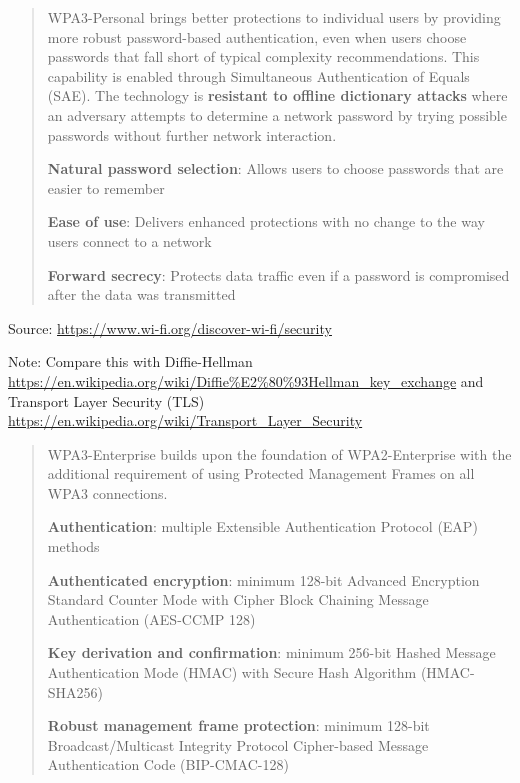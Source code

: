 \documentclass[Screen16to9,17pt]{foils}
\begin{document}

\begin{quote}
WPA3-Personal brings better protections to individual users by providing more robust password-based authentication, even when users choose passwords that fall short of typical complexity recommendations. This capability is enabled through Simultaneous Authentication of Equals (SAE). The technology is {\bf resistant to offline dictionary attacks} where an adversary attempts to determine a network password by trying possible passwords without further network interaction.

\begin{list2}
\item {\bf Natural password selection}: Allows users to choose passwords that are easier to remember
\item {\bf Ease of use}: Delivers enhanced protections with no change to the way users connect to a network
\item {\bf Forward secrecy}: Protects data traffic even if a password is compromised after the data was transmitted
\end{list2}
\end{quote}

Source: \url{https://www.wi-fi.org/discover-wi-fi/security}

Note: Compare this with Diffie-Hellman \url{https://en.wikipedia.org/wiki/Diffie%E2%80%93Hellman_key_exchange} and Transport Layer Security (TLS) \url{https://en.wikipedia.org/wiki/Transport_Layer_Security}




\begin{quote}
WPA3-Enterprise builds upon the foundation of WPA2-Enterprise with the additional requirement of using Protected Management Frames on all WPA3 connections.

\begin{list2}
\item {\bf Authentication}: multiple Extensible Authentication Protocol (EAP) methods
\item {\bf Authenticated encryption}: minimum 128-bit Advanced Encryption Standard Counter Mode with Cipher Block Chaining Message Authentication (AES-CCMP 128)
\item {\bf Key derivation and confirmation}: minimum 256-bit Hashed Message Authentication Mode (HMAC) with Secure Hash Algorithm (HMAC-SHA256)
\item {\bf Robust management frame protection}: minimum 128-bit Broadcast/Multicast Integrity Protocol Cipher-based Message Authentication Code (BIP-CMAC-128)
\end{list2}
\end{quote}
\end{document}
